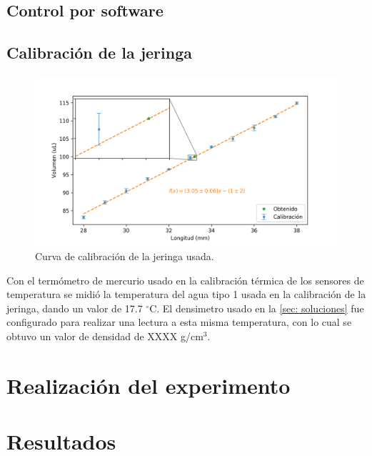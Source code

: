 	\subsection{Control por software}
	
	
	\subsection{Calibraci\'on de la jeringa}
		\begin{figure}[h]
			\centering
			\includegraphics[width=\linewidth]{../Data/Syringe/syringe_cal.png}
			\caption{Curva de calibraci\'on de la jeringa usada.}
			\label{fig: calibracion_jeringa}
		\end{figure}
	
		Con el termómetro de mercurio usado en la calibración térmica de los sensores de temperatura se midió la temperatura del agua tipo 1 usada en la calibración de la jeringa, dando un valor de 17.7 $^\circ$C. El densimetro usado en la \autoref{sec: soluciones} fue configurado para realizar una lectura a esta misma temperatura, con lo cual se obtuvo un valor de densidad de XXXX g/cm$^3$.
	
\section{Realizaci\'on del experimento}

\section{Resultados}


		